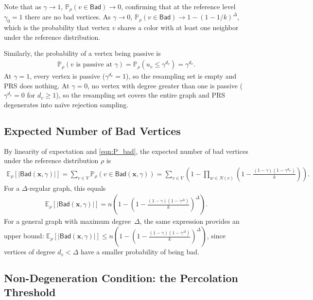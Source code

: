 \documentclass[12pt, a4paper]{article}
\theoremstyle{plain}
\theoremstyle{definition}
\theoremstyle{remark}
\newcommand{\mbb}{\mathbb}
\renewcommand{\v}[1]{\boldsymbol{#1}}
\newcommand{\mx}{\v{x}}
\newcommand{\bad}{\mathsf{Bad}}
\begin{document}
Note that as \(\gamma\to1\), \(\mbb P_\rho(v\in\bad)\to0\), confirming that at the reference level \(\gamma_0=1\) there are no bad vertices. As \(\gamma\to0\), \(\mbb P_\rho(v\in\bad)\to1-(1-1/k)^\Delta\), which is the probability that vertex \(v\) shares a color with at least one neighbor under the reference distribution.

Similarly, the probability of a vertex being passive is
\begin{align}\label{eqn:P_passive}
\mbb P_\rho(v\text{ is passive at }\gamma) = \mbb P_\rho(u_v\leq\gamma^{d_v}) = \gamma^{d_v}.
\end{align}
At \(\gamma=1\), every vertex is passive (\(\gamma^{d_v}=1\)), so the resampling set is empty and PRS does nothing. At \(\gamma=0\), no vertex with degree greater than one is passive (\(\gamma^{d_v}=0\) for \(d_v\geq1\)), so the resampling set covers the entire graph and PRS degenerates into na\"{i}ve rejection sampling.

\subsection{Expected Number of Bad Vertices}

By linearity of expectation and \eqref{eqn:P_bad}, the expected number of bad vertices under the reference distribution \(\rho\) is
\begin{align}\label{eqn:E_bad_size}
\mbb E_\rho\left[|\bad(\mx,\gamma)|\right] = \sum_{v\in V}\mbb P_\rho(v\in\bad(\mx,\gamma)) = \sum_{v\in V}\left(1-\prod_{w\in N(v)}\left(1-\frac{(1-\gamma)(1-\gamma^{d_w})}{k}\right)\right).
\end{align}
For a \(\Delta\)-regular graph, this equals
\begin{align}\label{eqn:E_bad_regular}
\mbb E_\rho\left[|\bad(\mx,\gamma)|\right] = n\left(1-\left(1-\frac{(1-\gamma)(1-\gamma^{\Delta})}{k}\right)^{\Delta}\right).
\end{align}
For a general graph with maximum degree~\(\Delta\), the same expression provides an upper bound: \(\mbb E_\rho[|\bad(\mx,\gamma)|] \leq n\!\left(1-\!\left(1-\frac{(1-\gamma)(1-\gamma^{\Delta})}{k}\right)^{\Delta}\right)\!\), since vertices of degree \(d_v < \Delta\) have a smaller probability of being bad.

\subsection{Non-Degeneration Condition: the Percolation Threshold}\label{sec:non-degen}
\end{document}
